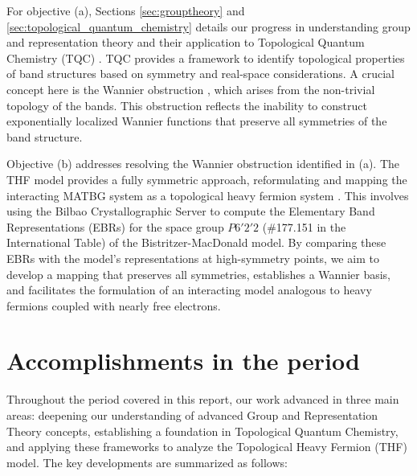\documentclass[12pt]{report}
\begin{document}
For objective (a), Sections \ref{sec:grouptheory} and \ref{sec:topological_quantum_chemistry} details our progress in understanding group and representation theory and their application to Topological Quantum Chemistry (TQC) \cite{topological_quantum_chemistry2017}. TQC provides a framework to identify topological properties of band structures based on symmetry and real-space considerations. A crucial concept here is the Wannier obstruction \cite{zou2018}, which arises from the non-trivial topology of the bands. This obstruction reflects the inability to construct exponentially localized Wannier functions that preserve all symmetries of the band structure.

Objective (b) addresses resolving the Wannier obstruction identified in (a). The THF model provides a fully symmetric approach, reformulating and mapping the interacting MATBG system as a topological heavy fermion system \cite{topoheavyfermion2022}. This involves using the Bilbao Crystallographic Server \cite{bilbao_1, bilbao_2} to compute the Elementary Band Representations (EBRs) for the space group \( P6'2'2 \) (\#177.151 in the International Table) of the Bistritzer-MacDonald model. By comparing these EBRs with the model's representations at high-symmetry points, we aim to develop a mapping that preserves all symmetries, establishes a Wannier basis, and facilitates the formulation of an interacting model analogous to heavy fermions coupled with nearly free electrons.

\pagebreak


\chapter{Accomplishments in the period} \label{chp:accomplishments}

Throughout the period covered in this report, our work advanced in three main areas: deepening our understanding of advanced Group and Representation Theory concepts, establishing a foundation in Topological Quantum Chemistry, and applying these frameworks to analyze the Topological Heavy Fermion (THF) model. The key developments are summarized as follows:
\end{document}
